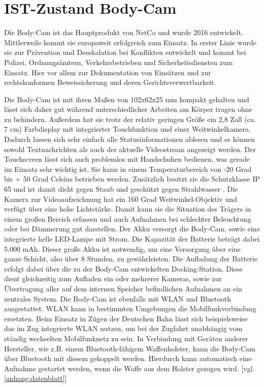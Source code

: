 \documentclass[thesis.tex]{subfiles}
\begin{document}
\section{IST-Zustand Body-Cam}

Die Body-Cam ist das Hauptprodukt von NetCo und wurde 2016 entwickelt. Mittlerweile kommt sie europaweit erfolgreich zum Einsatz.
In erster Linie wurde sie zur Prävention und Deeskalation bei Konflikten entwickelt und kommt bei Polizei, Ordnungsämtern, Verkehrsbetrieben und Sicherheitsdiensten zum Einsatz.
Hier vor allem zur Dokumentation von Einsätzen und zur rechtskonformen Beweissicherung und deren Gerichtsverwertbarkeit.

Die Body-Cam ist mit ihren Maßen von 102x62x25 mm kompakt gehalten und lässt sich daher gut während unterschiedlicher Arbeiten am Körper tragen ohne zu behindern.
Außerdem hat sie trotz der relativ geringen Größe ein 2,8 Zoll (ca. 7 cm) Farbdisplay mit integrierter Touchfunktion und einer Weitwinkelkamera. Dadurch lassen sich sehr einfach alle Statusinformationen ablesen und es können sowohl Textnachrichten als auch der aktuelle Videostream angezeigt werden.
Der Touchscreen lässt sich auch problemlos mit Handschuhen bedienen, was gerade im Einsatz sehr wichtig ist.
Sie kann in einem Temperaturbereich von -20 Grad bis + 50 Grad Celsius betrieben werden.
Zusätzlich besitzt sie die Schutzklasse IP 65 und ist damit dicht gegen Staub und geschützt gegen Strahlwasser \cite[S.44]{Elektro_Baugruppen}.
Die Kamera zur Videoaufzeichnung hat ein 160 Grad Weitwinkel-Objektiv und verfügt über eine hohe Lichtstärke.
Damit kann sie die Situation des Trägers in einem großen Bereich erfassen und auch Aufnahmen bei schlechter Beleuchtung oder bei Dämmerung gut darstellen.
Der Akku versorgt die Body-Cam, sowie eine integrierte helle LED-Lampe mit Strom.
Die Kapazität der Batterie beträgt dabei 5.000 mAh.
Dieser große Akku ist notwendig, um eine Versorgung über eine ganze Schicht, also über 8 Stunden, zu gewährleisten.
Die Aufladung der Batterie erfolgt dabei über die zu der Body-Cam entwickelten Docking-Station.
Diese dient gleichzeitig zum Aufladen ein oder mehrerer Kameras, sowie zur Übertragung aller auf dem internen Speicher befindlichen Aufnahmen an ein zentrales System.
Die Body-Cam ist ebenfalls mit WLAN und Bluetooth ausgestattet.
WLAN kann in bestimmten Umgebungen die Mobilfunkverbindung ersetzten.
Beim Einsatz in Zügen der Deutschen Bahn lässt sich beispielsweise das im Zug integrierte WLAN nutzen, um bei der Zugfahrt unabhängig vom ständig wechselten Mobilfunknetz zu sein.
In Verbindung mit Geräten anderer Hersteller, wie z.B. einem Bluetooth-fähigem Waffenholster, kann die Body-Cam über Bluetooth mit diesem gekoppelt werden.
Hierdurch kann automatisch eine Aufnahme gestartet werden, wenn die Waffe aus dem Holster gezogen wird.
[vgl. \autoref{anhang:datenblatt}]
\end{document}
